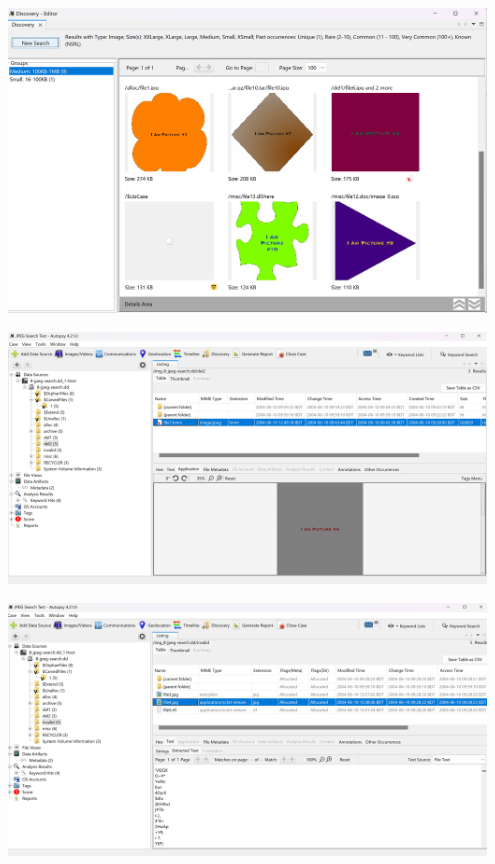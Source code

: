 \documentclass{article}
\begin{document}
\begin{center}
    \includegraphics[width=0.95\textwidth]{6/6.4/All JPEG Images Found by Autopsy.png}
\end{center}

\begin{center}
    \includegraphics[width=0.95\textwidth]{6/6.4/Detecting Images with Corrupted Extension.png}
\end{center}

\begin{center}
    \includegraphics[width=0.95\textwidth]{6/6.4/Detecting Other File Types with JPEG Extension.png}
\end{center}
\end{document}
